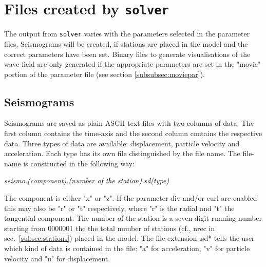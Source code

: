 	\section{Files created by \texttt{solver}}
	\label{sec:solver}
		The output from \texttt{solver} varies with the parameters selected in the parameter files. Seismograms will be created, if stations are placed in the model and the correct parameters have been set. Binary files to generate visualisations of the wave-field are only generated if the appropriate parameters are set in the "movie" portion of the parameter file (see section \ref{subsubsec:moviepar}).
		
		\subsection{Seismograms}
			Seismograms are saved as plain ASCII text files with two columns of data: The first column contains the time-axis and the second column contains the respective data. Three types of data are available: displacement, particle velocity and acceleration. Each type has its own file distinguished by the file name. The file-name is constructed in the following way:
			\begin{center}%
				\emph{seismo.(component).(number of the station).sd(type)}
			\end{center}
			The component is either "x" or "z". If the parameter div and/or curl are enabled this may also be "r" or "t" respectively, where "r" is the radial and "t" the tangential component. The number of the station is a seven-digit running number starting from 0000001 the the total number of stations (cf., nrec in sec.~\ref{subsec:stations}) placed in the model. The file extension .sd* tells the user which kind of data is contained in the file: "a" for acceleration, "v" for particle velocity and "u" for displacement.\\
			
			
